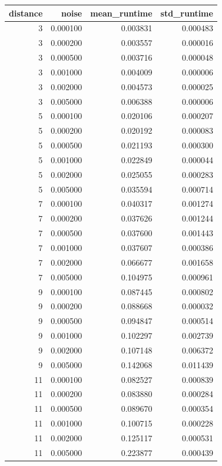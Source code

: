 \begin{tabular}{rrrr}
\toprule
distance & noise & mean_runtime & std_runtime \\
\midrule
3 & 0.000100 & 0.003831 & 0.000483 \\
3 & 0.000200 & 0.003557 & 0.000016 \\
3 & 0.000500 & 0.003716 & 0.000048 \\
3 & 0.001000 & 0.004009 & 0.000006 \\
3 & 0.002000 & 0.004573 & 0.000025 \\
3 & 0.005000 & 0.006388 & 0.000006 \\
5 & 0.000100 & 0.020106 & 0.000207 \\
5 & 0.000200 & 0.020192 & 0.000083 \\
5 & 0.000500 & 0.021193 & 0.000300 \\
5 & 0.001000 & 0.022849 & 0.000044 \\
5 & 0.002000 & 0.025055 & 0.000283 \\
5 & 0.005000 & 0.035594 & 0.000714 \\
7 & 0.000100 & 0.040317 & 0.001274 \\
7 & 0.000200 & 0.037626 & 0.001244 \\
7 & 0.000500 & 0.037600 & 0.001443 \\
7 & 0.001000 & 0.037607 & 0.000386 \\
7 & 0.002000 & 0.066677 & 0.001658 \\
7 & 0.005000 & 0.104975 & 0.000961 \\
9 & 0.000100 & 0.087445 & 0.000802 \\
9 & 0.000200 & 0.088668 & 0.000032 \\
9 & 0.000500 & 0.094847 & 0.000514 \\
9 & 0.001000 & 0.102297 & 0.002739 \\
9 & 0.002000 & 0.107148 & 0.006372 \\
9 & 0.005000 & 0.142068 & 0.011439 \\
11 & 0.000100 & 0.082527 & 0.000839 \\
11 & 0.000200 & 0.083880 & 0.000284 \\
11 & 0.000500 & 0.089670 & 0.000354 \\
11 & 0.001000 & 0.100715 & 0.000228 \\
11 & 0.002000 & 0.125117 & 0.000531 \\
11 & 0.005000 & 0.223877 & 0.000439 \\
\bottomrule
\end{tabular}
